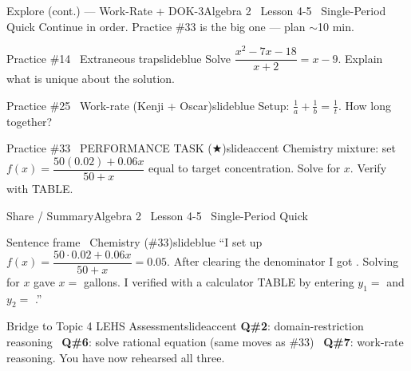 \documentclass[aspectratio=169, 11pt]{beamer}
\begin{document}
\begin{frame}{Explore (cont.) --- Work-Rate + DOK-3}{Algebra 2 \textperiodcentered\ Lesson 4-5 \textperiodcentered\ Single-Period Quick}
\small\textcolor{slidegray}{Continue in order. Practice \#33 is the big one --- plan \(\sim\)10 min.}

\vspace{0.15cm}
\begin{projcard}{Practice \#14 \textperiodcentered\ Extraneous trap}{slideblue}
Solve \(\dfrac{x^2-7x-18}{x+2} = x-9\). Explain what is unique about the solution.
\end{projcard}
\vspace{-0.12cm}
\begin{projcard}{Practice \#25 \textperiodcentered\ Work-rate (Kenji + Oscar)}{slideblue}
Setup: \(\tfrac{1}{a} + \tfrac{1}{b} = \tfrac{1}{t}\). How long together?
\end{projcard}
\vspace{-0.12cm}
\begin{projcard}{Practice \#33 \textperiodcentered\ PERFORMANCE TASK (\(\bigstar\))}{slideaccent}
Chemistry mixture: set \(f(x) = \dfrac{50(0.02)+0.06x}{50+x}\) equal to target concentration. Solve for \(x\). Verify with TABLE.
\end{projcard}
\end{frame}

\begin{frame}{Share / Summary}{Algebra 2 \textperiodcentered\ Lesson 4-5 \textperiodcentered\ Single-Period Quick}
\vspace{0.2cm}
\begin{projcard}{Sentence frame \textperiodcentered\ Chemistry (\#33)}{slideblue}
\small
``I set up \(f(x) = \dfrac{50\cdot0.02 + 0.06x}{50+x} = 0.05\). After clearing the denominator I got \underline{\hspace{1.2cm}}. Solving for \(x\) gave \(x =\) \underline{\hspace{0.8cm}} gallons. I verified with a calculator TABLE by entering \(y_1 =\) \underline{\hspace{1cm}} and \(y_2 =\) \underline{\hspace{1cm}}.''
\end{projcard}

\vspace{0.15cm}
\begin{projcard}{Bridge to Topic 4 LEHS Assessment}{slideaccent}
\small
\textbf{Q\#2}: domain-restriction reasoning \textperiodcentered\
\textbf{Q\#6}: solve rational equation (same moves as \#33) \textperiodcentered\
\textbf{Q\#7}: work-rate reasoning.
You have now rehearsed all three.
\end{projcard}
\end{frame}
\end{document}
